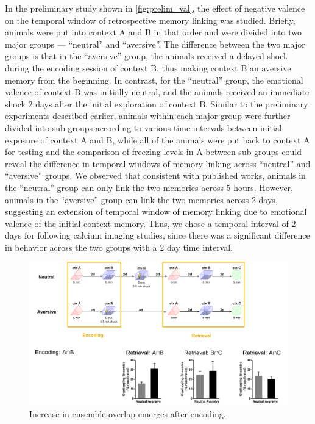 \documentclass[master.tex]{subfiles}
\begin{document}
In the preliminary study shown in \autoref{fig:prelim_val}, the effect of
negative valence on the temporal window of retrospective memory linking was
studied. Briefly, animals were put into context A and B in that order and were
divided into two major groups --- ``neutral'' and ``aversive''. The difference
between the two major groups is that in the ``aversive'' group, the animals
received a delayed shock during the encoding session of context B, thus making
context B an aversive memory from the beginning. In contrast, for the
``neutral'' group, the emotional valence of context B was initially neutral, and
the animals received an immediate shock 2 days after the initial exploration of
context B. Similar to the preliminary experiments described earlier, animals
within each major group were further divided into sub groups according to various
time intervals between initial exposure of context A and B, while all of the
animals were put back to context A for testing and the comparison of freezing
levels in A between sub groups could reveal the difference in temporal windows
of memory linking across ``neutral'' and ``aversive'' groups. We observed that
consistent with published works, animals in the ``neutral'' group can only link
the two memories across 5 hours. However, animals in the ``aversive'' group can
link the two memories across 2 days, suggesting an extension of temporal window
of memory linking due to emotional valence of the initial context memory. Thus,
we chose a temporal interval of 2 days for following calcium imaging studies,
since there was a significant difference in behavior across the two groups with a
2 day time interval.

\begin{figure}
  \centering \includegraphics[scale = .09]{Figures/val_retro_prelim_imag.pdf}
  \caption{\footnotesize Increase in ensemble overlap emerges after encoding.}
  \label{fig:prelim_val_imag}
\end{figure}
\end{document}
